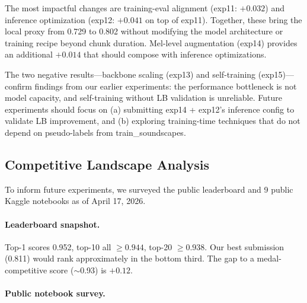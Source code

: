 The most impactful changes are training-eval alignment (exp11: $+0.032$) and
inference optimization (exp12: $+0.041$ on top of exp11). Together, these
bring the local proxy from 0.729 to 0.802 without modifying the model
architecture or training recipe beyond chunk duration. Mel-level augmentation
(exp14) provides an additional $+0.014$ that should compose with inference
optimizations.

The two negative results---backbone scaling (exp13) and self-training
(exp15)---confirm findings from our earlier experiments: the performance
bottleneck is not model capacity, and self-training without LB validation
is unreliable. Future experiments should focus on (a) submitting exp14 +
exp12's inference config to validate LB improvement, and (b) exploring
training-time techniques that do not depend on pseudo-labels from
train\_soundscapes.

\subsection{Competitive Landscape Analysis}
\label{sec:landscape}

To inform future experiments, we surveyed the public leaderboard and
9 public Kaggle notebooks as of April 17, 2026.

\paragraph{Leaderboard snapshot.}
Top-1 scores 0.952, top-10 all $\geq 0.944$, top-20 $\geq 0.938$.
Our best submission (0.811) would rank approximately in the bottom third.
The gap to a medal-competitive score ($\sim$0.93) is $+0.12$.

\paragraph{Public notebook survey.}

